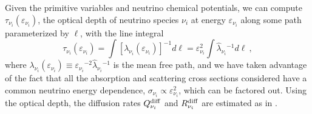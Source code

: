 Given the primitive variables
and neutrino chemical potentials, we can compute $\tau_{\nu_i}(\varepsilon_{\nu_i})$, the
optical depth of neutrino species $\nu_i$ at energy $\varepsilon_{\nu_i}$
along some path parameterized by $\ell$, with the line integral
\begin{equation}
\label{tau_integral}
\tau_{\nu_i}(\varepsilon_{\nu_i}) = \int [\lambda_{\nu_i}(\varepsilon_{\nu_i})]^{-1} d\ell
 = \varepsilon_{\nu_i}^2 \int \hat{\lambda}_{\nu_i}{}^{-1} d\ell\ ,
\end{equation}
where $\lambda_{\nu_i}(\varepsilon_{\nu_i})\equiv \varepsilon_{\nu_i}{}^{-2}\hat{\lambda}_{\nu_i}{}^{-1}$
is the mean free path, and we have taken advantage of the fact that all
the absorption and scattering cross sections considered have a common neutrino
energy dependence, $\sigma_{\nu_i}\propto \varepsilon_{\nu_i}^2$, which can be factored out.
Using the optical depth, the diffusion rates
$Q_{\nu_i}^{\rm diff}$ and $R_{\nu_i}^{\rm diff}$ are estimated as in
\cite{ross2003-leakage_part2}.

